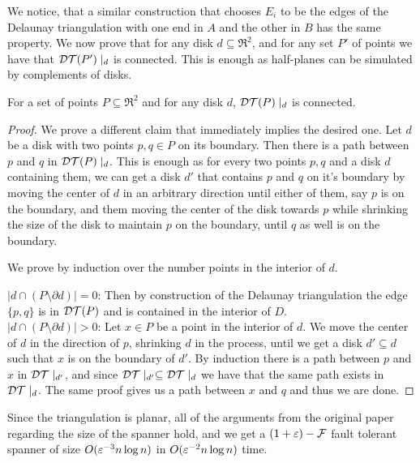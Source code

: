 \documentclass[12pt]{article}%
\begin{document}
We notice, that a similar construction that chooses $E_i$ to be the
edges of the Delaunay triangulation with one end in $A$ and the other
in $B$ has the same property. We now prove that for any disk
$d\subseteq \Re^2$, and for any set $P'$ of points we have that
$\mathcal{DT}(P')\mid_d$ is connected. This is enough as half-planes can be
simulated by complements of disks.

\begin{claim}
    For a set of points $P\subseteq \Re^2$ and for any disk $d$,
    $\mathcal{DT}(P)\mid_d$ is connected.
\end{claim}

\begin{proof}
    We prove a different claim that immediately implies the desired
    one. Let $d$ be a disk with two points $p,q\in P$ on its
    boundary. Then there is a path between $p$ and $q$ in
    $\mathcal{DT}(P)\mid_d$. This is enough as for every two points $p,q$ and a
    disk $d$ containing them, we can get a disk $d'$ that contains $p$
    and $q$ on it's boundary by moving the center of $d$ in an
    arbitrary direction until either of them, say $p$ is on the
    boundary, and them moving the center of the disk towards $p$ while
    shrinking the size of the disk to maintain $p$ on the boundary,
    until $q$ as well is on the boundary.
    
    We prove by induction over the number points in the interior of
    $d$.
    
    $|d\cap (P\setminus \partial d)| = 0$: Then by construction of the Delaunay triangulation the edge $\{p,q\}$ is in $\mathcal{DT}(P)$ and is contained in the interior of $D$.\\
    
    $|d\cap (P\setminus \partial d)| > 0$: Let $x\in P$ be a point in
    the interior of $d$. We move the center of $d$ in the direction of
    $p$, shrinking $d$ in the process, until we get a disk
    $d'\subseteq d$ such that $x$ is on the boundary of $d'$. By
    induction there is a path between $p$ and $x$ in $\mathcal{DT}\mid_{d'}$,
    and since $\mathcal{DT}\mid_{d'}\subseteq \mathcal{DT}\mid_{d}$ we have that the
    same path exists in $\mathcal{DT}\mid_{d}$. The same proof gives us a path
    between $x$ and $q$ and thus we are done.
    
\end{proof}

Since the triangulation is planar, all of the arguments from the
original paper regarding the size of the spanner hold, and we get a
$(1+\varepsilon)-\mathcal{F}$ fault tolerant spanner of size $O(\varepsilon^{-3}n\log n)$ in
$O(\varepsilon^{-2}n\log n)$ time.
\end{document}
